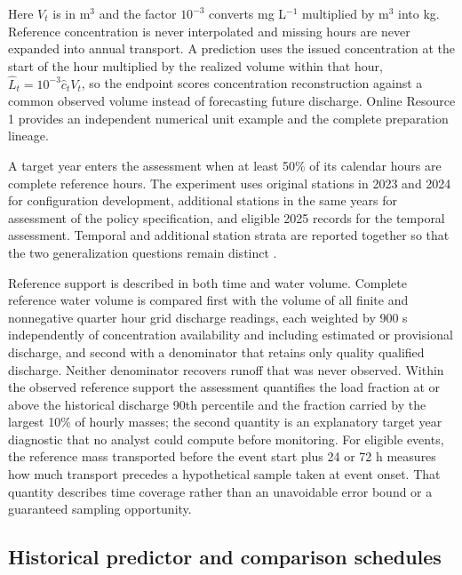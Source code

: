 \documentclass[lineno,pdflatex,sn-apa]{sn-jnl}%
\theoremstyle{thmstyleone}%
\theoremstyle{thmstyletwo}%
\theoremstyle{thmstylethree}%
\begin{document}
Here $V_t$ is in m$^{3}$ and the factor $10^{-3}$ converts mg L$^{-1}$ multiplied by m$^{3}$ into kg. Reference concentration is never interpolated and missing hours are never expanded into annual transport. A prediction uses the issued concentration at the start of the hour multiplied by the realized volume within that hour, $\widehat L_t=10^{-3}\widehat c_t V_t$, so the endpoint scores concentration reconstruction against a common observed volume instead of forecasting future discharge. Online Resource 1 provides an independent numerical unit example and the complete preparation lineage.

A target year enters the assessment when at least 50\% of its calendar hours are complete reference hours. The experiment uses original stations in 2023 and 2024 for configuration development, additional stations in the same years for assessment of the policy specification, and eligible 2025 records for the temporal assessment. Temporal and additional station strata are reported together so that the two generalization questions remain distinct \citep{roberts2017}.

Reference support is described in both time and water volume. Complete reference water volume is compared first with the volume of all finite and nonnegative quarter hour grid discharge readings, each weighted by 900 s independently of concentration availability and including estimated or provisional discharge, and second with a denominator that retains only quality qualified discharge. Neither denominator recovers runoff that was never observed. Within the observed reference support the assessment quantifies the load fraction at or above the historical discharge 90th percentile and the fraction carried by the largest 10\% of hourly masses; the second quantity is an explanatory target year diagnostic that no analyst could compute before monitoring. For eligible events, the reference mass transported before the event start plus 24 or 72 h measures how much transport precedes a hypothetical sample taken at event onset. That quantity describes time coverage rather than an unavoidable error bound or a guaranteed sampling opportunity.

\subsection{Historical predictor and comparison schedules}
\end{document}
